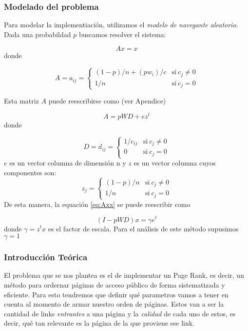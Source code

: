 \subsubsection*{Modelado del problema}
Para modelar la implementiaci\'on, utilizamos el \textit{modelo de navegante aleatorio}\cite{navegante}.
Dada una probabildad $p$ buscamos resolver el sistema:

\begin{equation}\label{eq:Axx}
    Ax = x
\end{equation}
donde 

\begin{equation}
 A = a_{ij} = \left\{
    \begin{array}{ll}
	 (1-p)/n + (p w_{i})/c & \mathrm{si\ } c_j\not=0\\
	 1/n & \mathrm{si\ } c_j=0
	 \end{array}
   \right.
\end{equation}

Esta matriz $A$ puede reescribirse como (ver Apendice)

\begin{equation}\label{eq:desarrollada}
    A = p WD + ez^{t}
\end{equation}
donde

\[
 D = d_{ij} = \left\{
    \begin{array}{ll}
	 1/c_{ij} & \mathrm{si\ } c_j\not=0\\
	 0 & \mathrm{si\ } c_j=0
	 \end{array}
   \right.
\]   
$e$ es un vector columna de dimensi\'on n y $z$ es un vector columna cuyos componentes son:
\[   
  z_{j} = \left\{
    \begin{array}{ll}
	 (1-p)/n & \mathrm{si\ } c_j\not=0\\
	 1/n & \mathrm{si\ } c_j=0
	 \end{array}
   \right.
\]  
De esta manera, la equaci\'on \ref{eq:Axx} se puede reescribir como

\begin{equation}\label{ipwd}
    (I - pWD)x = \gamma e^t 
\end{equation}
donde $\gamma = z^tx$ es el factor de escala. Para el an\'alisis de este m\'etodo supusimos
$\gamma = 1$


\subsubsection*{Introducción Teórica}

\par El problema que se nos plantea es el de implementar un Page Rank, es decir, 
un método para ordernar páginas de acceso público de forma sistematizada y eficiente. 
Para esto tendremos que definir qu\'e parametros vamos a tener en cuenta al momento de 
armar nuestro orden de páginas. Estos van a ser la cantidad de links \textit{entrantes} 
a una página y la \textit{calidad} de cada uno de estos, es decir, qu\'e tan relevante 
es la página de la que proviene ese link.\newline


